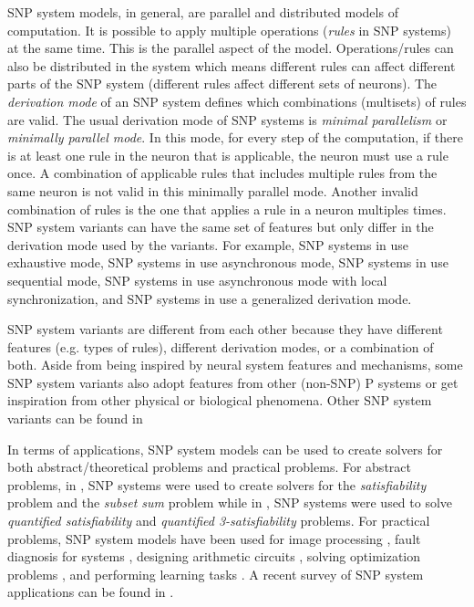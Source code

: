 \documentclass[smallextended]{svjour3}
\begin{document}
SNP system models, in general, are parallel and distributed models of computation. It is possible to
apply multiple operations (\emph{rules} in SNP systems) at the same time. This is the parallel
aspect of the model. Operations/rules can also be distributed in the system which means different
rules can affect different parts of the SNP system (different rules affect different sets of 
neurons). The \emph{derivation mode} of an SNP system defines which combinations (multisets) of 
rules are valid. The usual derivation mode of SNP systems is \emph{minimal parallelism} or
\emph{minimally parallel mode}. In this mode, for every step of the computation, if there is at 
least one rule in the neuron that is applicable, the neuron must use a rule once. A combination of
applicable rules that includes multiple rules from the same neuron is not valid in this 
minimally parallel mode. Another invalid combination of rules is the one that applies a rule in
a neuron multiples times. SNP system variants can have the same set of features but only differ in
the derivation mode used by the variants. For example, SNP systems in \cite{ionescu-2007-exhaustive}
use exhaustive mode, SNP systems in \cite{cavaliere-2009-asynchronous} use asynchronous mode, SNP
systems in \cite{ibarra-2009-min-max-sequential} use sequential mode, SNP systems in \cite{song-2013-local-sync}
use asynchronous mode with local synchronization, and SNP systems in  
\cite{zhang-2014-general-rule-use,jiang-2019-improved-usnp-general-rule-use} use a generalized 
derivation mode.

SNP system variants are different from each other because they have different features (e.g. types of rules),
different derivation modes, or a combination of both. Aside from being inspired by neural system 
features and mechanisms, some SNP system variants also adopt features from other (non-SNP) P 
systems or get inspiration from other physical or biological phenomena. Other SNP system variants 
can be found in   
 \cite{chen-2008-snp-e,alhazov-2006-esnp,chen-2007-axon-p,pan-2009-anti-spikes,song-2014-rules-on-synapses,metta-2014-cooperating-rules,wu-2016-cell-like,song-2016-request-rules,pan-2017-communication-on-request,song-2018-colored-spikes}

In terms of applications, SNP system models can be used to create solvers for both abstract/theoretical
problems and practical problems. For abstract problems, in \cite{leporati-2008-snp-sat-subset-sum}, 
SNP systems were used to create solvers for the \emph{satisfiability} problem and the \emph{subset sum} problem
while in \cite{ishdorj-2010-snp-qsat-q3sat}, SNP systems were used to solve \emph{quantified satisfiability}
and \emph{quantified 3-satisfiability} problems. For practical problems, SNP system models have been
used for image processing \cite{diaz-pernil-2019-mc-image-proc,diaz-pernil-2013-snp-skeleton,song-2019-snp-weights-skeleton},
fault diagnosis for systems \cite{peng-2013-fuzzy-snp,peng-2013-fuzzy-snp-fault},
designing arithmetic circuits \cite{ochirbat-2020-snp-adder,xu-2014-snp-arithmetic-circuits},
solving optimization problems \cite{zhang-2014-optimization-snp}, and performing learning tasks \cite{song-2019-learning-functions}.
A recent survey of SNP system  applications can be found in \cite{fan-2020-snp-app-survey}.
\end{document}
